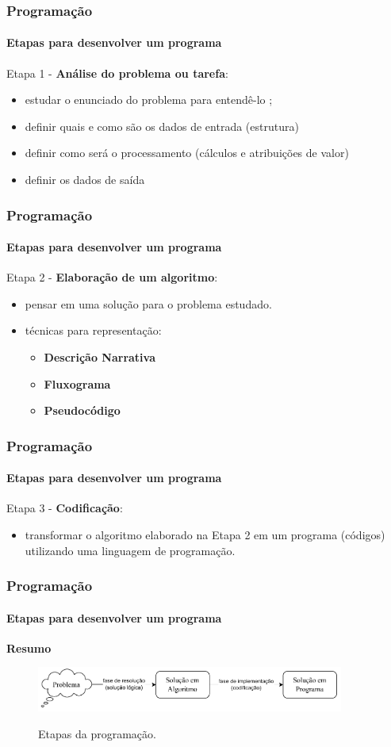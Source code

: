 \begin{frame}
	\frametitle{Programação}
	\framesubtitle{Etapas para desenvolver um programa}
	Etapa 1 - \textbf{Análise do problema ou tarefa}:
	\begin{itemize}
		\item estudar o enunciado do problema para entendê-lo ;
		\item definir quais e como são os dados de entrada (estrutura)
		\item definir como será o processamento (cálculos e atribuições de valor)
		\item definir os dados de saída 
	\end{itemize}
\end{frame}


\begin{frame}
	\frametitle{Programação}
	\framesubtitle{Etapas para desenvolver um programa}
	Etapa 2 - \textbf{Elaboração de um algoritmo}:
	\begin{itemize}
		\item pensar em uma solução para o problema estudado.
		\item técnicas para representação:
		\begin{itemize}
			\item \textbf{Descrição Narrativa}
			
			\item \textbf{Fluxograma}
			
			\item \textbf{Pseudocódigo}	
		\end{itemize}
	
	\end{itemize}
	
\end{frame}


\begin{frame}
	\frametitle{Programação}
	\framesubtitle{Etapas para desenvolver um programa}
	Etapa 3 - \textbf{Codificação}:
	\begin{itemize}
		\item transformar o algoritmo elaborado na Etapa 2 em um programa (códigos) utilizando uma linguagem de programação.
	\end{itemize}
\end{frame}



\begin{frame}
	\frametitle{Programação}
	\framesubtitle{Etapas para desenvolver um programa}
	\textbf{Resumo}

	\begin{figure}
		\centering
		\includegraphics[width=0.9\textwidth]{../../figuras/etapas-programacao.pdf}\\[-2ex]
		\caption{Etapas da programação.}
		\label{fig:etapas-programacao-2}
	\end{figure}
\end{frame}

